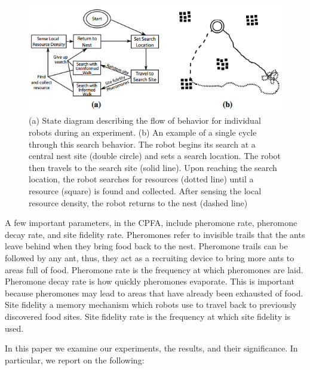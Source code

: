 \documentclass{acm_proc_article-sp}
\begin{document}
\begin{figure}[t]
\includegraphics[width=18cm]{images/CPFA}
\caption{(a) State diagram describing the flow of behavior for individual robots during an experiment. (b) An example of a single cycle through this search behavior. The robot begins its search at a central nest site (double circle) and sets a search location. The robot then travels to the search site (solid line). Upon reaching the search location, the robot searches for resources (dotted line) until a resource (square) is found and collected. After sensing the local resource density, the robot returns to the nest (dashed line)\cite{hecker:CPFA}} \label{fig:CPFA}
\end{figure}

A few important parameters, in the CPFA, include pheromone rate, pheromone decay rate, and site fidelity rate. Pheromones refer to invisible trails that the ants leave behind when they bring food back to the nest. Pheromone trails can be followed by any ant, thus, they act as a recruiting device to bring more ants to areas full of food. Pheromone rate is the frequency at which pheromones are laid. Pheromone decay rate is how quickly pheromones evaporate. This is important because pheromones may lead to areas that have already been exhausted of food. Site fidelity a memory mechanism which robots use to travel back to previously discovered food sites. Site fidelity rate is the frequency at which site fidelity is used.

In this paper we examine our experiments, the results, and their significance. In particular, we report on the following:
\end{document}
